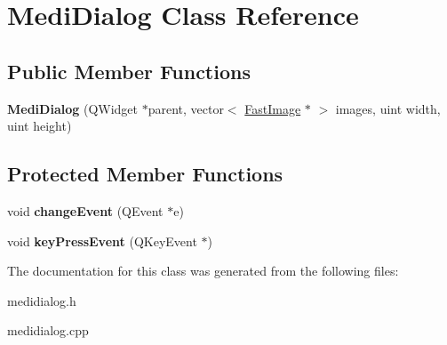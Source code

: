 \hypertarget{class_medi_dialog}{
\section{MediDialog Class Reference}
\label{class_medi_dialog}
}
\subsection*{Public Member Functions}
\begin{DoxyCompactItemize}
\item 
\hypertarget{class_medi_dialog_a5ba83757052acf6f897dd4b3c9d70af3}{
{\bfseries MediDialog} (QWidget $\ast$parent, vector$<$ \hyperlink{class_fast_image}{FastImage} $\ast$ $>$ images, uint width, uint height)}
\label{class_medi_dialog_a5ba83757052acf6f897dd4b3c9d70af3}

\end{DoxyCompactItemize}
\subsection*{Protected Member Functions}
\begin{DoxyCompactItemize}
\item 
\hypertarget{class_medi_dialog_af0d94bbf8a5248bc23c4ee2567b25f58}{
void {\bfseries changeEvent} (QEvent $\ast$e)}
\label{class_medi_dialog_af0d94bbf8a5248bc23c4ee2567b25f58}

\item 
\hypertarget{class_medi_dialog_ae9fe5642ed0e589ec885fca1f350661d}{
void {\bfseries keyPressEvent} (QKeyEvent $\ast$)}
\label{class_medi_dialog_ae9fe5642ed0e589ec885fca1f350661d}

\end{DoxyCompactItemize}


The documentation for this class was generated from the following files:\begin{DoxyCompactItemize}
\item 
medidialog.h\item 
medidialog.cpp\end{DoxyCompactItemize}

